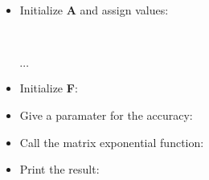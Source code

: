 \begin{itemize}
\item Initialize {\bf A} and assign values:\\
  \\
  \\
  \\
$\cdots$ 
\item Initialize {\bf F}:\\
\item Give a paramater for the accuracy:\\
\item Call the matrix exponential function:\\
\item Print the result: \\
\end{itemize}






